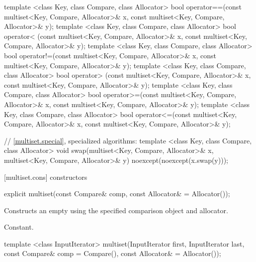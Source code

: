 \begin{codeblock}
{  template <class Key, class Compare, class Allocator>
    bool operator==(const multiset<Key, Compare, Allocator>& x,
                    const multiset<Key, Compare, Allocator>& y);
  template <class Key, class Compare, class Allocator>
    bool operator< (const multiset<Key, Compare, Allocator>& x,
                    const multiset<Key, Compare, Allocator>& y);
  template <class Key, class Compare, class Allocator>
    bool operator!=(const multiset<Key, Compare, Allocator>& x,
                    const multiset<Key, Compare, Allocator>& y);
  template <class Key, class Compare, class Allocator>
    bool operator> (const multiset<Key, Compare, Allocator>& x,
                    const multiset<Key, Compare, Allocator>& y);
  template <class Key, class Compare, class Allocator>
    bool operator>=(const multiset<Key, Compare, Allocator>& x,
                    const multiset<Key, Compare, Allocator>& y);
  template <class Key, class Compare, class Allocator>
    bool operator<=(const multiset<Key, Compare, Allocator>& x,
                    const multiset<Key, Compare, Allocator>& y);

  // \ref{multiset.special}, specialized algorithms:
  template <class Key, class Compare, class Allocator>
    void swap(multiset<Key, Compare, Allocator>& x,
              multiset<Key, Compare, Allocator>& y)
      noexcept(noexcept(x.swap(y)));
}
\end{codeblock}%
%

[multiset.cons]{ constructors}

%
\begin{itemdecl}
explicit multiset(const Compare& comp, const Allocator& = Allocator());
\end{itemdecl}

\begin{itemdescr}
\pnum
\effects
Constructs an empty  using the specified comparison object and allocator.

\pnum
\complexity
Constant.
\end{itemdescr}

%
\begin{itemdecl}
template <class InputIterator>
  multiset(InputIterator first, InputIterator last,
           const Compare& comp = Compare(), const Allocator& = Allocator());
\end{itemdecl}

